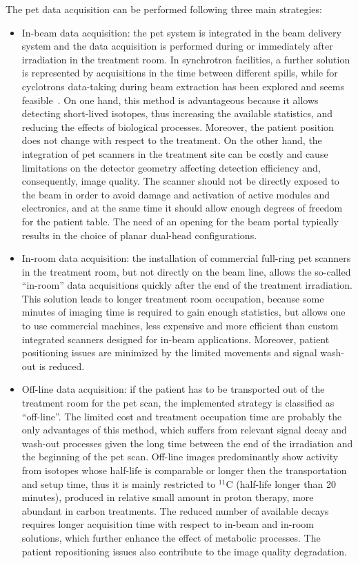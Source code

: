 The \gls{pet} data acquisition can be performed following three main strategies:
\begin{itemize}
\item In-beam data acquisition: the \gls{pet} system is integrated in the beam delivery system and the data acquisition is performed during or immediately after irradiation in the treatment room. In synchrotron facilities, a further solution is represented by acquisitions in the time between different spills, while for cyclotrons data-taking during beam extraction has been explored and seems feasible~\parencite{Kraan2014}. On one hand, this method is advantageous because it allows detecting short-lived isotopes, thus increasing the available statistics, and reducing the effects of biological processes. Moreover, the patient position does not change with respect to the treatment. On the other hand, the integration of \gls{pet} scanners in the treatment site can be costly and cause limitations on the detector geometry affecting detection efficiency and, consequently, image quality. The scanner should not be directly exposed to the beam in order to avoid damage and activation of active modules and electronics, and at the same time it should allow enough degrees of freedom for the patient table. The need of an opening for the beam portal typically results in the choice of planar dual-head configurations.
\item In-room data acquisition: the installation of commercial full-ring \gls{pet} scanners in the treatment room, but not directly on the beam line, allows the so-called \enquote{in-room} data acquisitions quickly after the end of the treatment irradiation. This solution leads to longer treatment room occupation, because some minutes of imaging time is required to gain enough statistics, but allows one to use commercial machines, less expensive and more efficient than custom integrated scanners designed for in-beam applications. Moreover, patient positioning issues are minimized by the limited movements and signal wash-out is reduced.
\item Off-line data acquisition: if the patient has to be transported out of the treatment room for the \gls{pet} scan, the implemented strategy is classified as \enquote{off-line}. The limited cost and treatment occupation time are probably the only advantages of this method, which suffers from relevant signal decay and wash-out processes given the long time between the end of the irradiation and the beginning of the \gls{pet} scan. Off-line images predominantly show activity from isotopes whose half-life is comparable or longer then the transportation and setup time, thus it is mainly restricted to $^{11}$C (half-life longer than 20 minutes), produced in relative small amount in proton therapy, more abundant in carbon treatments. The reduced number of available decays requires longer acquisition time with respect to in-beam and in-room solutions, which further enhance the effect of metabolic processes. The patient repositioning issues also contribute to the image quality degradation. 
\end{itemize}
